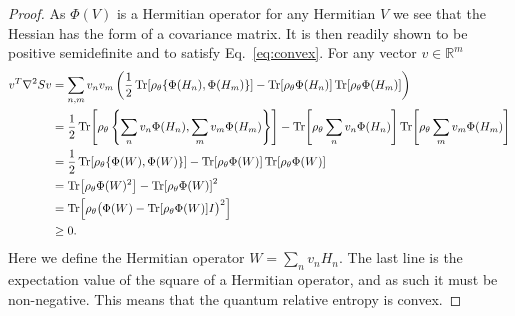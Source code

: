 \documentclass[
    reprint,
    aps,
    prx,
    longbibliography
]{revtex4-2}
\begin{document}
\begin{proof}
As $ \Phi(V)$ is a Hermitian operator for any Hermitian $V$ we see that the Hessian has the form of a covariance matrix. It is then readily shown to be positive semidefinite and to satisfy Eq.~\eqref{eq:convex}. For any vector $v \in \mathbb{R}^m$
\begin{align}
\begin{split}
\label{eq:positive_semidefinite}
    v^T \nabla^2 S v &=  \sum_{n,m} v_n v_m \left( \frac{1}{2} \Tr[ \rho_\theta \{ \Phi(H_n), \Phi(H_m) \}] - \Tr[ \rho_\theta \Phi(H_n)] \Tr[ \rho_\theta \Phi(H_m)] \right) \\
    &= \frac{1}{2} \Tr[ \rho_\theta \left\{ \sum_n v_n \Phi(H_n), \sum_m v_m \Phi(H_m) \right\}] - \Tr[ \rho_\theta \sum_n v_n \Phi(H_n)] \Tr[ \rho_\theta \sum_m v_m \Phi(H_m)] \\
    &= \frac{1}{2} \Tr[ \rho_\theta \{ \Phi(W), \Phi(W) \}] - \Tr[ \rho_\theta \Phi(W)] \Tr[ \rho_\theta \Phi(W)] \\
    &= \Tr[ \rho_\theta \Phi(W)^2 ] - \Tr[ \rho_\theta \Phi(W)]^2 \\
    &= \Tr[ \rho_\theta \big( \Phi(W) - \Tr[ \rho_\theta \Phi(W)] I \big )^2 ] \\
    &\geq 0 .
\end{split}
\end{align} 
Here we define the Hermitian operator $W = \sum_n v_n H_n$. The last line is the expectation value of the square of a Hermitian operator, and as such it must be non-negative. This means that the quantum relative entropy is convex. 


\end{proof}
\end{document}
